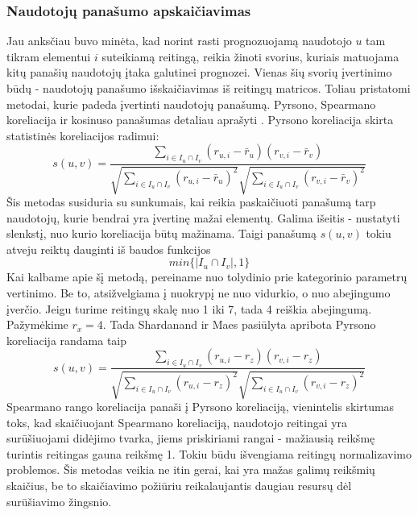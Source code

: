 \documentclass{VUMIFInfMagistrinis}
\begin{document}
\subsubsection{Naudotojų panašumo apskaičiavimas}\label{ssec:sim}
Jau anksčiau buvo minėta, kad norint rasti prognozuojamą naudotojo $u$ tam tikram elementui $i$ suteikiamą reitingą, reikia žinoti svorius, kuriais matuojama kitų panašių naudotojų įtaka galutinei prognozei. Vienas šių svorių įvertinimo būdų - naudotojų panašumo išskaičiavimas iš reitingų matricos. Toliau pristatomi metodai, kurie padeda įvertinti naudotojų panašumą. Pyrsono, Spearmano koreliacija ir kosinuso panašumas detaliau aprašyti \cite{2}.
Pyrsono koreliacija skirta statistinės koreliacijos radimui:
\begin{equation}
s(u,v) = \frac{\sum \limits_{i\in I_u \cap I_v }(r_{u,i}-\bar{r}_u)(r_{v,i}-\bar{r}_v)}{\sqrt{\sum\limits_{i \in I_u \cap I_v }(r_{u,i} - \bar{r}_u)^2}\sqrt{\sum\limits_{i \in I_u \cap I_v }(r_{v,i} - \bar{r}_v)^2}}
\end{equation}
Šis metodas susiduria su sunkumais, kai reikia paskaičiuoti panašumą tarp naudotojų, kurie bendrai yra įvertinę mažai elementų. Galima išeitis - nustatyti slenkstį, nuo kurio koreliacija būtų mažinama. Taigi panašumą $s(u,v)$ tokiu atveju reiktų dauginti iš baudos funkcijos 
\begin{equation}
min\{|I_u \cap I_v|, 1\}
\end{equation}
Kai kalbame apie šį metodą, pereiname nuo tolydinio prie kategorinio parametrų vertinimo. Be to, atsižvelgiama į nuokrypį ne nuo vidurkio, o nuo abejingumo įverčio. Jeigu turime reitingų skalę nuo 1 iki 7, tada 4 reiškia abejingumą. Pažymėkime $r_x = 4$. Tada Shardanand ir Maes pasiūlyta apribota Pyrsono koreliacija randama taip
\begin{equation}
s(u,v) = \frac{\sum \limits_{i\in I_u \cap I_v }(r_{u,i}-r_z)(r_{v,i}-r_z)}{\sqrt{\sum\limits_{i \in I_u \cap I_v }(r_{u,i} - r_z)^2}\sqrt{\sum\limits_{i \in I_u \cap I_v }(r_{v,i} - r_z)^2}}
\end{equation}
Spearmano rango koreliacija panaši į Pyrsono koreliaciją, vienintelis skirtumas toks, kad skaičiuojant Spearmano koreliaciją, naudotojo reitingai yra surūšiuojami didėjimo tvarka, jiems priskiriami rangai - mažiausią reikšmę turintis reitingas gauna reikšmę 1. Tokiu būdu išvengiama reitingų normalizavimo problemos. Šis metodas veikia ne itin gerai, kai yra mažas galimų reikšmių skaičius, be to skaičiavimo požiūriu reikalaujantis daugiau resursų dėl surūšiavimo žingsnio.
\end{document}
